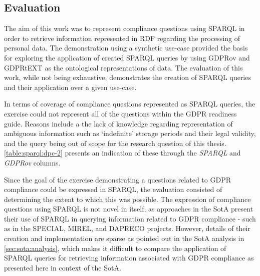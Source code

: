 \subsection{Evaluation}\label{sec:testing:sparql:evaluation}
The aim of this work was to represent compliance questions using SPARQL in order to retrieve information represented in RDF regarding the processing of personal data.
The demonstration using a synthetic use-case provided the basis for exploring the application of created SPARQL queries by using GDPRov and GDPRtEXT as the ontological representations of data.
The evaluation of this work, while not being exhaustive, demonstrates the creation of SPARQL queries and their application over a given use-case.

In terms of coverage of compliance questions represented as SPARQL queries, the exercise could not represent all of the questions within the GDPR readiness guide.
Reasons include a the lack of knowledge regarding representation of ambiguous information such as `indefinite' storage periods and their legal validity, and the query being out of scope for the research question of this thesis.
\autoref{table:sparql:dpc-2} presents an indication of these through the \textit{SPARQL} and \textit{GDPRov} columns.

Since the goal of the exercise demonstrating a questions related to GDPR compliance could be expressed in SPARQL, the evaluation consisted of determining the extent to which this was possible. 
The expression of compliance questions using SPARQL is not novel in itself, as approaches in the SotA present their use of SPARQL in querying information related to GDPR compliance - such as in the SPECIAL, MIREL, and DAPRECO projects.
However, details of their creation and implementation are sparse as pointed out in the SotA analysis in \autoref{sec:sota:analysis}, which makes it difficult to compare the application of SPARQL queries for retrieving information associated with GDPR compliance as presented here in context of the SotA.

